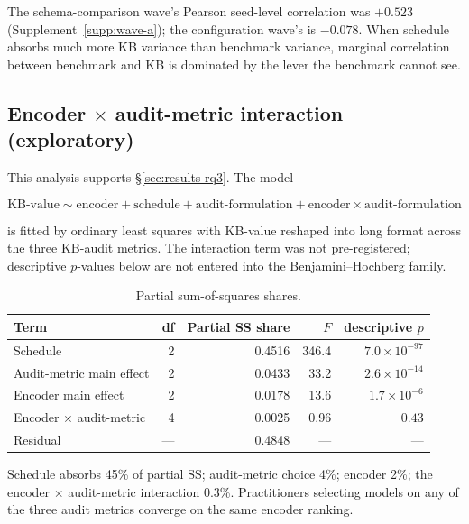 The schema-comparison wave's Pearson seed-level correlation was
$+0.523$ (Supplement~\ref{supp:wave-a}); the configuration wave's
is $-0.078$. When schedule absorbs much more KB variance than
benchmark variance, marginal correlation between benchmark and KB
is dominated by the lever the benchmark cannot see.

\subsection{Encoder $\times$ audit-metric interaction (exploratory)}

This analysis supports \S\ref{sec:results-rq3}. The model

$$\text{KB-value} \sim \text{encoder} + \text{schedule} + \text{audit-formulation} + \text{encoder}\times\text{audit-formulation}$$

is fitted by ordinary least squares with KB-value reshaped into
long format across the three KB-audit metrics. The
interaction term was not pre-registered; descriptive $p$-values
below are not entered into the Benjamini--Hochberg family.

\begin{table}[H]
\centering
\caption{Partial sum-of-squares shares.}
\label{tab:s6-interaction}
\small
\begin{tabular}{@{}lrrrr@{}}
\toprule
\textbf{Term} & \textbf{df} & \textbf{Partial SS share} & \textbf{$F$} & \textbf{descriptive $p$} \\
\midrule
Schedule                          & 2 & 0.4516 & 346.4 & $7.0\!\times\!10^{-97}$ \\
Audit-metric main effect          & 2 & 0.0433 & 33.2  & $2.6\!\times\!10^{-14}$ \\
Encoder main effect               & 2 & 0.0178 & 13.6  & $1.7\!\times\!10^{-6}$ \\
Encoder $\times$ audit-metric     & 4 & 0.0025 & 0.96  & $0.43$ \\
Residual                          & --- & 0.4848 & --- & --- \\
\bottomrule
\end{tabular}
\end{table}

Schedule absorbs 45\% of partial SS; audit-metric choice 4\%;
encoder 2\%; the encoder $\times$ audit-metric interaction 0.3\%.
Practitioners selecting models on any of the three audit metrics
converge on the same encoder ranking.

